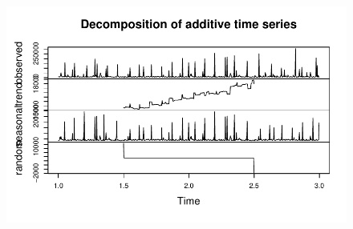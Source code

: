 \documentclass[
  letterpaper,
  DIV=11,
  numbers=noendperiod]{scrartcl}
\begin{document}
\begin{figure}[H]

{\centering \includegraphics{Time-Serise-EDA_files/figure-pdf/unnamed-chunk-2-6.pdf}

}

\end{figure}
\end{document}
